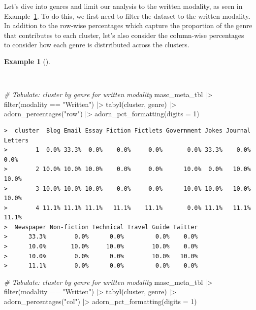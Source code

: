 \documentclass[
  letterpaper,
  DIV=11,
  numbers=noendperiod]{scrreport}
\newenvironment{Shaded}{\begin{snugshade}}{\end{snugshade}}
\newcommand{\AttributeTok}[1]{\textcolor[rgb]{0.00,0.00,0.00}{#1}}
\newcommand{\CommentTok}[1]{\textcolor[rgb]{0.00,0.00,0.00}{\textit{#1}}}
\newcommand{\DecValTok}[1]{\textcolor[rgb]{0.00,0.00,0.00}{#1}}
\newcommand{\FunctionTok}[1]{\textcolor[rgb]{0.00,0.00,0.00}{#1}}
\newcommand{\NormalTok}[1]{\textcolor[rgb]{0.00,0.00,0.00}{#1}}
\newcommand{\SpecialCharTok}[1]{\textcolor[rgb]{0.00,0.00,0.00}{#1}}
\newcommand{\StringTok}[1]{\textcolor[rgb]{0.00,0.00,0.00}{#1}}
\theoremstyle{definition}
\newtheorem{example}{Example}[chapter]
\theoremstyle{remark}
\begin{document}
Let's dive into genres and limit our analysis to the written modality,
as seen in Example~\ref{exm-eda-masc-pos-kmeans-genre}. To do this, we
first need to filter the dataset to the written modality. In addition to
the row-wise percentages which capture the proportion of the genre that
contributes to each cluster, let's also consider the column-wise
percentages to consider how each genre is distrributed across the
clusters.

\begin{example}[]\protect\hypertarget{exm-eda-masc-pos-kmeans-genre}{}\label{exm-eda-masc-pos-kmeans-genre}

~

\begin{Shaded}
\begin{Highlighting}[]
\CommentTok{\# Tabulate: cluster by genre for written modality}
\NormalTok{masc\_meta\_tbl }\SpecialCharTok{|\textgreater{}}
  \FunctionTok{filter}\NormalTok{(modality }\SpecialCharTok{==} \StringTok{"Written"}\NormalTok{) }\SpecialCharTok{|\textgreater{}}
  \FunctionTok{tabyl}\NormalTok{(cluster, genre) }\SpecialCharTok{|\textgreater{}} 
  \FunctionTok{adorn\_percentages}\NormalTok{(}\StringTok{"row"}\NormalTok{) }\SpecialCharTok{|\textgreater{}} 
  \FunctionTok{adorn\_pct\_formatting}\NormalTok{(}\AttributeTok{digits =} \DecValTok{1}\NormalTok{)}
\end{Highlighting}
\end{Shaded}

\begin{verbatim}
>  cluster  Blog Email Essay Fiction Fictlets Government Jokes Journal Letters
>        1  0.0% 33.3%  0.0%    0.0%     0.0%       0.0% 33.3%    0.0%    0.0%
>        2 10.0% 10.0% 10.0%    0.0%     0.0%      10.0%  0.0%   10.0%   10.0%
>        3 10.0% 10.0% 10.0%    0.0%     0.0%      10.0% 10.0%   10.0%   10.0%
>        4 11.1% 11.1% 11.1%   11.1%    11.1%       0.0% 11.1%   11.1%   11.1%
>  Newspaper Non-fiction Technical Travel Guide Twitter
>      33.3%        0.0%      0.0%         0.0%    0.0%
>      10.0%       10.0%     10.0%        10.0%    0.0%
>      10.0%        0.0%      0.0%        10.0%   10.0%
>      11.1%        0.0%      0.0%         0.0%    0.0%
\end{verbatim}

\begin{Shaded}
\begin{Highlighting}[]
\CommentTok{\# Tabulate: cluster by genre for written modality}
\NormalTok{masc\_meta\_tbl }\SpecialCharTok{|\textgreater{}}
  \FunctionTok{filter}\NormalTok{(modality }\SpecialCharTok{==} \StringTok{"Written"}\NormalTok{) }\SpecialCharTok{|\textgreater{}}
  \FunctionTok{tabyl}\NormalTok{(cluster, genre) }\SpecialCharTok{|\textgreater{}} 
  \FunctionTok{adorn\_percentages}\NormalTok{(}\StringTok{"col"}\NormalTok{) }\SpecialCharTok{|\textgreater{}} 
  \FunctionTok{adorn\_pct\_formatting}\NormalTok{(}\AttributeTok{digits =} \DecValTok{1}\NormalTok{)}
\end{Highlighting}
\end{Shaded}


\end{example}
\end{document}
